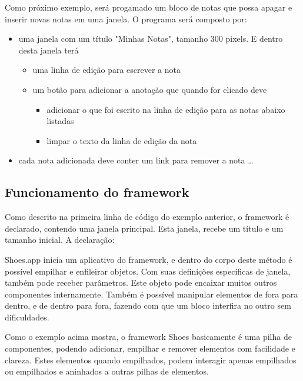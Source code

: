 \documentclass[12pt]{article}
\begin{document}
Como próximo exemplo, será progamado um bloco de notas que possa apagar e inserir novas notas em uma janela. O programa será composto por:
\begin{itemize} 
  \item uma janela com um título "Minhas Notas", tamanho 300 pixels. E dentro desta janela terá 
  \begin{itemize} 
    \item uma linha de edição para escrever a nota
    \item um botão para adicionar a anotação que quando for clicado deve 
    \begin{itemize} 
      \item adicionar o que foi escrito na linha de edição para as notas abaixo listadas
      \item limpar o texto da linha de edição da nota
    \end{itemize} 
  \end{itemize} 
  \item cada nota adicionada deve conter um link para remover a nota \ldots
\end{itemize} 


\subsection { Funcionamento do framework }

Como descrito na primeira linha de código do exemplo anterior, o framework é declarado, contendo uma janela principal. Esta janela, recebe um título e um tamanho inicial.
A declaração:

 

Shoes.app inicia um aplicativo do framework, e dentro do corpo deste método é possível empilhar e enfileirar objetos. Com suas definições específicas de janela, também pode receber parâmetros. Este objeto pode encaixar muitos outros componentes internamente. Também é possível manipular elementos de fora para dentro, e de dentro para fora, fazendo com que um bloco interfira no outro sem dificuldades.

Como o exemplo acima mostra, o framework Shoes basicamente é uma pilha de componentes, podendo adicionar, empilhar e remover elementos com facilidade e clareza. Estes elementos quando empilhados, podem interagir apenas empilhados ou empilhados e aninhados a outras pilhas de elementos. 


 
\end{document}
